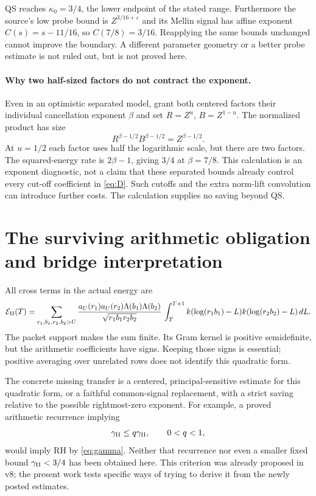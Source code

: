 \documentclass[11pt]{article}
\newcommand{\dd}{\,d}
\newcommand{\E}{\mathcal E}
\begin{document}
QS reaches $\kappa_0=3/4$, the lower endpoint of the stated range.
Furthermore the source's low probe bound is $Z^{3/16+\varepsilon}$ and
its Mellin signal has affine exponent $C(s)=s-11/16$, so
$C(7/8)=3/16$. Reapplying the same bounds unchanged cannot improve the
boundary. A different parameter geometry or a better probe estimate is
not ruled out, but is not proved here.

\paragraph{Why two half-sized factors do not contract the exponent.}
Even in an optimistic separated model, grant both centered factors their
individual cancellation exponent $\beta$ and set $R=Z^u$, $B=Z^{1-u}$.
The normalized product has size
\[
 R^{\beta-1/2}B^{\beta-1/2}
       =Z^{\beta-1/2}.
\]
At $u=1/2$ each factor uses half the logarithmic scale, but there are two
factors. The squared-energy rate is $2\beta-1$, giving $3/4$ at
$\beta=7/8$. This calculation is an exponent diagnostic, not a claim
that these separated bounds already control every cut-off coefficient
in \eqref{eq:D}. Such cutoffs and the extra norm-lift convolution can
introduce further costs. The calculation supplies no saving beyond QS.

\section{The surviving arithmetic obligation and bridge interpretation}
All cross terms in the actual energy are
\begin{align*}
 \E_{\rm II}(T)
 =\sum_{r_1,b_1,r_2,b_2>U}
 \frac{a_U(r_1)a_U(r_2)\Lambda(b_1)\Lambda(b_2)}
 {\sqrt{r_1b_1r_2b_2}}\,
 \int_T^{T+1}k(\log(r_1b_1)-L)k(\log(r_2b_2)-L)\dd L.
\end{align*}
The packet support makes the sum finite. Its Gram kernel is positive
semidefinite, but the arithmetic coefficients have signs. Keeping those
signs is essential; positive averaging over unrelated rows does not
identify this quadratic form.

The concrete missing transfer is a centered, principal-sensitive estimate
for this quadratic form, or a faithful common-signal replacement, with a
strict saving relative to the possible rightmost-zero exponent. For
example, a proved arithmetic recurrence implying
\[
 \gamma_{\rm II}\le q\gamma_{\rm II},\qquad 0<q<1,
\]
would imply RH by \eqref{eq:gamma}. Neither that recurrence nor even a
smaller fixed bound $\gamma_{\rm II}<3/4$ has been obtained here. This
criterion was already proposed in v8; the present work tests specific
ways of trying to derive it from the newly posted estimates.
\end{document}
